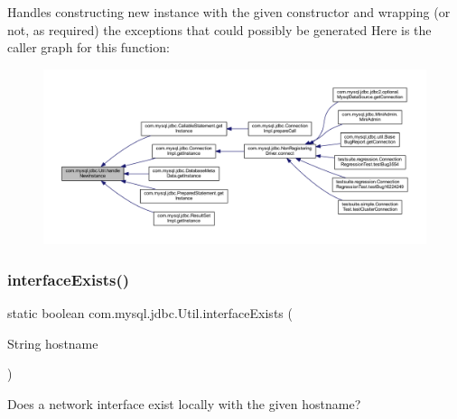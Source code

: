 Handles constructing new instance with the given constructor and wrapping (or not, as required) the exceptions that could possibly be generated Here is the caller graph for this function\+:
\nopagebreak
\begin{figure}[H]
\begin{center}
\leavevmode
\includegraphics[width=350pt]{classcom_1_1mysql_1_1jdbc_1_1_util_ae60ce70ba2e8e536e773f4abab83c4c1_icgraph}
\end{center}
\end{figure}
\mbox{\label{classcom_1_1mysql_1_1jdbc_1_1_util_a41c9a999e60af4e782a5c0eb055c7b22}} 
\subsubsection{\texorpdfstring{interface\+Exists()}{interfaceExists()}}
{\footnotesize\ttfamily static boolean com.\+mysql.\+jdbc.\+Util.\+interface\+Exists (\begin{DoxyParamCaption}\item[{String}]{hostname }\end{DoxyParamCaption})\hspace{0.3cm}{\ttfamily [static]}}

Does a network interface exist locally with the given hostname?


